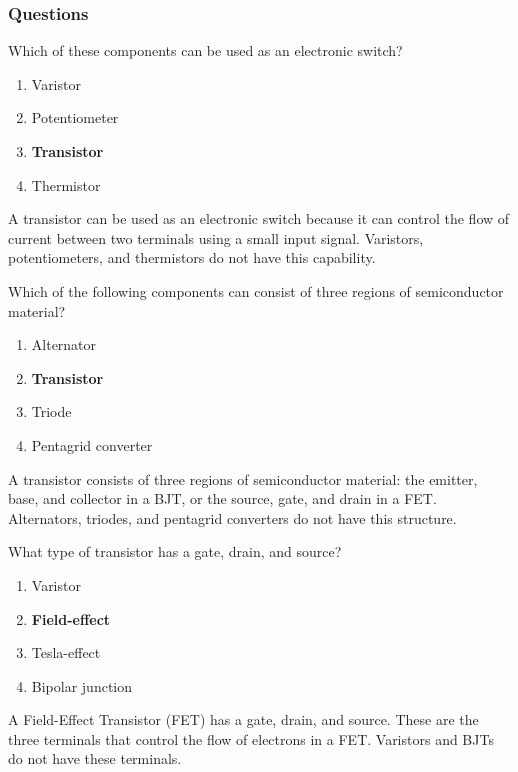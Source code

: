 \subsubsection*{Questions}
\begin{tcolorbox}[colback=gray!10!white,colframe=black!75!black,title={T6B03}]
    Which of these components can be used as an electronic switch?
    \begin{enumerate}[label=\Alph*),noitemsep]
        \item Varistor
        \item Potentiometer
        \item \textbf{Transistor}
        \item Thermistor
    \end{enumerate}
\end{tcolorbox}
A transistor can be used as an electronic switch because it can control the flow of current between two terminals using a small input signal. Varistors, potentiometers, and thermistors do not have this capability.

\begin{tcolorbox}[colback=gray!10!white,colframe=black!75!black,title={T6B04}]
    Which of the following components can consist of three regions of semiconductor material?
    \begin{enumerate}[label=\Alph*),noitemsep]
        \item Alternator
        \item \textbf{Transistor}
        \item Triode
        \item Pentagrid converter
    \end{enumerate}
\end{tcolorbox}
A transistor consists of three regions of semiconductor material: the emitter, base, and collector in a BJT, or the source, gate, and drain in a FET. Alternators, triodes, and pentagrid converters do not have this structure.

\begin{tcolorbox}[colback=gray!10!white,colframe=black!75!black,title={T6B05}]
    What type of transistor has a gate, drain, and source?
    \begin{enumerate}[label=\Alph*),noitemsep]
        \item Varistor
        \item \textbf{Field-effect}
        \item Tesla-effect
        \item Bipolar junction
    \end{enumerate}
\end{tcolorbox}
A Field-Effect Transistor (FET) has a gate, drain, and source. These are the three terminals that control the flow of electrons in a FET. Varistors and BJTs do not have these terminals.

